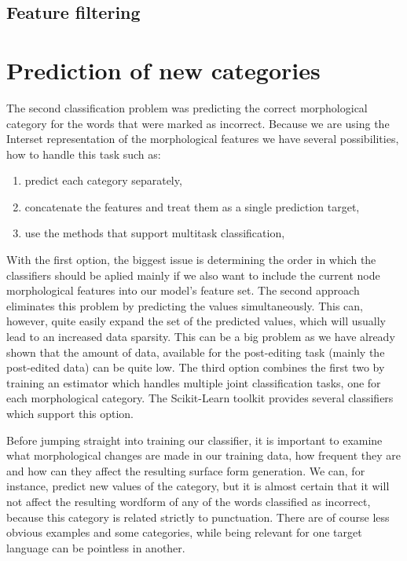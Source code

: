 



\subsection{Feature filtering}



\section{Prediction of new categories}

The second classification problem was predicting the correct morphological category for
the words that were marked as incorrect. Because we are using the Interset representation
of the morphological features we have several possibilities, how to handle this task such
as:
\begin{enumerate}
    \item predict each category separately,
    \item concatenate the features and treat them as a single prediction target,
    \item use the methods that support multitask classification,
\end{enumerate}

With the first option, the biggest issue is determining the order in which the classifiers
should be aplied mainly if we also want to include the current node morphological features
into our model's feature set. The second approach eliminates this problem by predicting the
values simultaneously. This can, however, quite easily expand the set of the predicted values,
which will usually lead to an increased data sparsity. This can be a big problem as we have
already shown that the amount of data, available for the post-editing task (mainly the post-edited
data) can be quite low. The third option combines the first two by training an estimator
which handles multiple joint classification tasks, one for each morphological category. The
Scikit-Learn toolkit provides several classifiers which support this option.

Before jumping straight into training our classifier, it is important to examine what morphological
changes are made in our training data, how frequent they are and how can they affect the resulting
surface form generation. We can, for instance, predict new values of the  category,
but it is almost certain that it will not affect the resulting wordform of any of the words
classified as incorrect, because this category is related strictly to punctuation. There are
of course less obvious examples and some categories, while being relevant for one target language
can be pointless in another.

